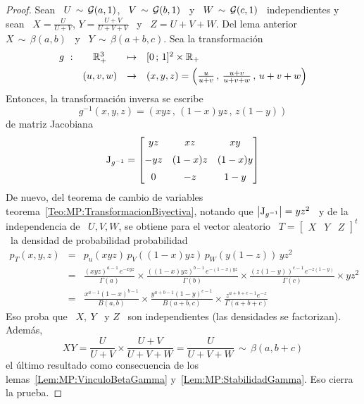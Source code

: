 %
\begin{proof}
  Sean \ $U  \, \sim \, \mathcal{G}(a,1)$, \ $V \,  \sim \, \mathcal{G}(b,1)$ \ y \  $W \, \sim \,
  \mathcal{G}(c,1)$   \   independientes  y   sean   \   $X   =  \frac{U}{U+V}$,   $Y   =
  \frac{U+V}{U+V+V}$  \ y  \ $Z  = U+V+W$.  Del lema  anterior \  $X \,  \sim \,
  \beta(a,b)$ \ y \ $Y \, \sim \, \beta(a+b,c)$. Sea la transformaci\'on
  \[
  \begin{array}{lccl}
    g\ : & \mathbb{R}_+^3 & \mapsto & [0 \, ; \, 1]^2 \times \mathbb{R}_+\\[1.5mm]
    & (u,v,w) & \to & (x,y,z) = \left( \frac{u}{u+v} \, , \, \frac{u+v}{u+v+w} \, , \, u+v+w \right)
  \end{array}
  \]
  Entonces, la transformaci\'on inversa se escribe
  \[
  g^{-1}(x,y,z) = \left( x y z \, , \, (1-x) y z \, , \, z (1-y) \right)
  \]
  de matriz Jacobiana
  \[
  \operatorname{J}_{g^{-1}} = \begin{bmatrix}
    y z  &   x z   &   x y   \\[2mm]
  - y z  & (1-x) z & (1-x) y \\[2mm]
    0    &  - z    &  1-y
  \end{bmatrix}
  \]
  De      nuevo,      del      teorema      de     cambio      de      variables
  teorema~\ref{Teo:MP:TransformacionBiyectiva}, notando que $\left| \operatorname{J}_{g^{-1}}
  \right| = y  z^2$ \ y de la independencia  de \ $U, V, W$,  se obtiene para el
  vector aleatorio  \ $  T =  \begin{bmatrix} X &  Y &  Z \end{bmatrix}^t$  \ la
  densidad de probabilidad probabilidad
  \begin{eqnarray*}
    p_T(x,y,z) & = & p_u( x y z ) \, p_V( (1-x) y z ) \, p_W( y (1-z) ) \, y z^2\\[2mm]
    & = & \frac{\left( x y z \right)^{a-1} \, e^{- x y z}}{\Gamma(a)} \times
    \frac{\left( (1-x) y z \right)^{b-1} \, e^{- (1-x) y z}}{\Gamma(b)} \times
    \frac{\left( z (1-y) \right)^{c-1} \, e^{- z (1-y)}}{\Gamma(c)} \times y
    z^2\\[2mm]
    & = & \frac{x^{a-1} (1-x)^{b-1}}{B(a,b)} \times \frac{y^{a+b-1}
      (1-y)^{c-1}}{B(a+b,c)} \times \frac{z^{a+b+c-1} e^{-z}}{\Gamma(a+b+c)}
  \end{eqnarray*}
  Eso proba  que \  $X, \ Y$  \ y  $Z$ \ son  independientes (las  densidades se
  factorizan). Adem\'as,
  \[
  X  Y =  \frac{U}{U+V} \times  \frac{U+V}{U+V+W} =  \frac{U}{U+V+W} \,  \sim \,
  \beta(a,b+c)
  \]
  el      \'ultimo       resultado      como      consecuencia       de      los
  lemas~\ref{Lem:MP:VinculoBetaGamma}    y~\ref{Lem:MP:StabilidadGamma}.     Eso
  cierra la prueba.
\end{proof}

